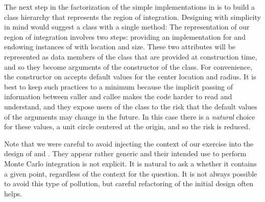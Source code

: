 The next step in the factorization of the simple implementations in  is to build
a class hierarchy that represents the region of integration. Designing with simplicity in mind
would suggest a class  with a single method:
%
%
%
The representation of our region of integration involves two steps: providing an
implementation for  and endowing instances of  with location and
size. These two attributes will be represented as data members of the class that are provided
at construction time, and so they become arguments of the constructor of the class.
%
%
%
%
%
%
%
For convenience, the constructor on  accepts default values for
the center location and radius. It is best to keep such practices to a minimum because the
implicit passing of information between caller and callee makes the code harder to read and
understand, and they expose users of the class  to the risk that the default
values of the arguments may change in the future. In this case there is a {\em natural} choice
for these values, a unit circle centered at the origin, and so the risk is reduced.

Note that we were careful to avoid injecting the context of our exercise into the design of
 and . They appear rather generic and their intended use to perform
Monte Carlo integration is not explicit. It is natural to ask a  whether it
contains a given point, regardless of the context for the question. It is not always possible
to avoid this type of pollution, but careful refactoring of the initial design often helps. 

